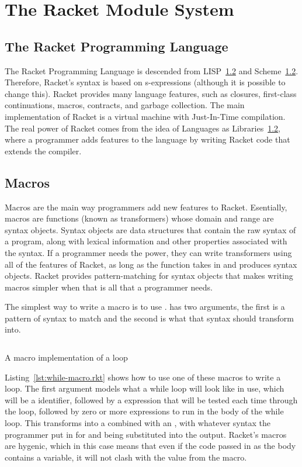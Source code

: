 \chapter{The Racket Module System}

\section{The Racket Programming Language}
The Racket Programming Language is descended from LISP~\ref{} and Scheme~\ref{}.
Therefore, Racket's syntax is based on s-expressions (although it is possible to change this).
Racket provides many language features, such as closures, first-class continuations, macros, contracts, and garbage collection.
The main implementation of Racket is a virtual machine with Just-In-Time compilation. 
The real power of Racket comes from the idea of Languages as Libraries~\ref{}, where a programmer adds features to the language by writing Racket code that extends the compiler.

\section{Macros}
Macros are the main way programmers add new features to Racket. 
Esentially, macros are functions (known as transformers) whose domain and range are syntax objects.
Syntax objects are data structures that contain the raw syntax of a program, along with lexical information and other properties associated with the syntax.
If a programmer needs the power, they can write transformers using all of the features of Racket, as long as the function takes in and produces syntax objects.
Racket provides pattern-matching for syntax objects that makes writing macros simpler when that is all that a programmer needs.

The simplest way to write a macro is to use .
 has two arguments, the first is a pattern of syntax to match and the second is what that syntax should transform into.
\begin{listing}
  \inputminted{racket}{listings/while-macro.rkt}
  \caption{A macro implementation of a  loop}
  \label{lst:while-macro.rkt}
\end{listing}
Listing~\ref{lst:while-macro.rkt} shows how to use one of these macros to write a  loop. 
The first argument models what a while loop will look like in use, which will be a  identifier, followed by a  expression that will be tested each time through the loop, followed by zero or more expressions to run in the body of the while loop.
This transforms into a  combined with an , with whatever syntax the programmer put in for  and  being substituted into the output.
Racket's macros are hygenic, which in this case means that even if the code passed in as the body contains a  variable, it will not clash with the value from the macro.

